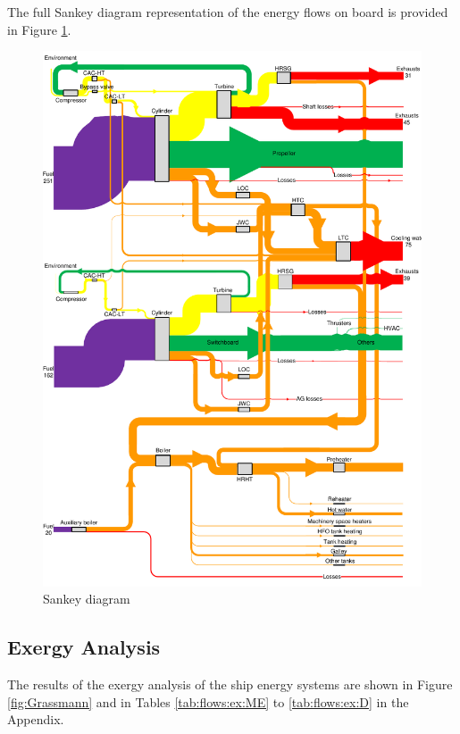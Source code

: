 \documentclass[preprint,12pt]{elsarticle}
\begin{document}
The full Sankey diagram representation of the energy flows on board is provided in Figure \ref{fig:Sankey}. 

\begin{figure}
	\centering
	\includegraphics[width=0.99\linewidth]{Figures/Sankey_diagram_energy_ship_v9}
	\caption{Sankey diagram}
	\label{fig:Sankey}
\end{figure}





\subsection{Exergy Analysis} \label{sec:res:exergy}

The results of the exergy analysis of the ship energy systems are shown in Figure \ref{fig:Grassmann} and in Tables \ref{tab:flows:ex:ME} to \ref{tab:flows:ex:D} in the Appendix. 
\end{document}

